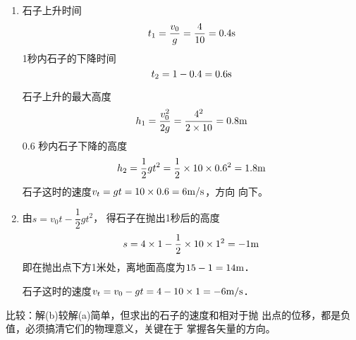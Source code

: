 \begin{enumerate}
\begin{solution}
\begin{enumerate}
    \item 石子上升时间
    \[t_1=\frac{v_0}{g}=\frac{4}{10}=0.4{\rm s}\]
    1秒内石子的下降时间$$t_2=1-0.4=0.6{\rm s}$$

    石子上升的最大高度
\[h_1=\frac{v_0^2}{2g}=\frac{4^2}{2\times 10}=0.8{\rm m}\]
0.6
秒内石子下降的高度
\[h_2=\frac{1}{2}gt^2=\frac{1}{2}\times 10\times0.6^2=1.8{\rm m}\]
石子这时的速度$v_t=gt=10\times0.6=6\text{m}/\text{s}$，方向
向下。
\item 由$s=v_0t-\dfrac{1}{2}gt^2$，
得石子在抛出1秒后的高度
\[s=4\times1-\frac{1}{2}\times10\times1^2=-1{\rm m}\]
即在抛出点下方1米处，离地面高度为$15-1=14{\rm m}$．

石子这时的速度$v_t=v_0-gt=4-10\times1=-6\text{m}/\text{s}$．
\end{enumerate}

比较：解(b)较解(a)简单，但求出的石子的速度和相对于抛
出点的位移，都是负值，必须搞清它们的物理意义，关键在于
掌握各矢量的方向。
\end{solution}
\end{enumerate}




